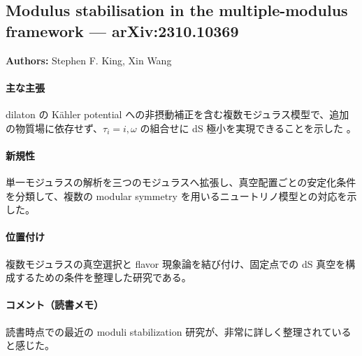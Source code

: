 \subsection{Modulus stabilisation in the multiple-modulus framework --- arXiv:2310.10369}

\textbf{Authors:} Stephen F. King, Xin Wang

\paragraph{主な主張}
dilaton の K\"{a}hler potential への非摂動補正を含む複数モジュラス模型で、追加の物質場に依存せず、$\tau_i=i,\omega$ の組合せに dS 極小を実現できることを示した \cite{King:2023snq}。

\paragraph{新規性}
単一モジュラスの解析を三つのモジュラスへ拡張し、真空配置ごとの安定化条件を分類して、複数の modular symmetry を用いるニュートリノ模型との対応を示した。

\paragraph{位置付け}
複数モジュラスの真空選択と flavor 現象論を結び付け、固定点での dS 真空を構成するための条件を整理した研究である。

\paragraph{コメント（読書メモ）}
読書時点での最近の moduli stabilization 研究が、非常に詳しく整理されていると感じた。
